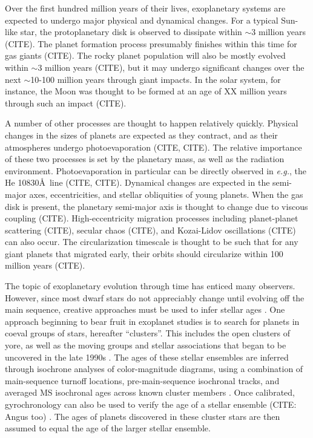 \documentclass[12pt,twocolumn,tighten]{aastex62}
\begin{document}
Over the first hundred million years of their lives, exoplanetary
systems are expected to undergo major physical and dynamical changes.
For a typical Sun-like star, the protoplanetary disk is observed to
dissipate within $\sim$3 million years (CITE).  The planet formation
process presumably finishes within this time for gas giants (CITE).
The rocky planet population will also be mostly evolved within $\sim$3
million years (CITE), but it may undergo significant changes over the
next $\sim$10-100 million years through giant impacts.  In the solar
system, for instance, the Moon was thought to be formed at an age of
XX million years through such an impact (CITE).

A number of other processes are thought to happen relatively quickly.
Physical changes in the sizes of planets are expected as they
contract, and as their atmospheres undergo photoevaporation (CITE,
CITE).  The relative importance of these two processes is set by the
planetary mass, as well as the radiation environment.
Photoevaporation in particular can be directly observed in {\it e.g.},
the He 10830\AA\ line (CITE, CITE).  Dynamical changes are expected in
the semi-major axes, eccentricities, and stellar obliquities of young
planets.  When the gas disk is present, the planetary semi-major axis
is thought to change due to viscous coupling (CITE).
High-eccentricity migration processes including planet-planet
scattering (CITE), secular chaos (CITE), and Kozai-Lidov oscillations
(CITE) can also occur.  The circularization timescale is thought to be
such that for any giant planets that migrated early, their orbits
should circularize within 100 million years (CITE).

The topic of exoplanetary evolution through time has enticed many
observers.  However, since most dwarf stars do not appreciably change
until evolving off the main sequence, creative approaches must be used
to infer stellar ages \citep{soderblom_ages_2010}.  One approach
beginning to bear fruit in exoplanet studies is to search for planets
in coeval groups of stars, hereafter ``clusters''.  This includes the
open clusters of yore, as well as the moving groups and stellar
associations that began to be uncovered in the late 1990s
\citep{zuckerman_young_2004}.  The ages of these stellar ensembles are
inferred through isochrone analyses of color-magnitude diagrams, using
a combination of main-sequence turnoff locations,
pre-main-sequence isochronal tracks, and averaged MS isochronal ages
across known cluster members \citep[{\it e.g.},][Section
3.4.3]{kharchenko_global_2012}.  Once calibrated, gyrochronology can
also be used to verify the age of a stellar ensemble (CITE: Angus too) \citep[{\it
e.g.},][]{barnes_color-period_2015,meibom_spin-down_2015,curtis_tess_2019}.
The ages of planets discovered in these cluster stars are then assumed
to equal the age of the larger stellar ensemble.
\end{document}
